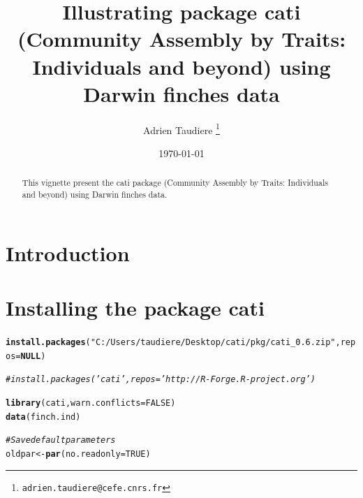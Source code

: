 \documentclass[12pt]{article}\usepackage[]{graphicx}\usepackage[]{color}
\title{Illustrating package cati (Community Assembly by Traits: Individuals and beyond) using Darwin finches data}
\author{Adrien Taudiere
  \thanks{\texttt{adrien.taudiere@cefe.cnrs.fr}}
}
\affil{{\footnotesize EPHE \\CEFE - Centre d'Ecologie Fonctionnelle et Evolutive}}
\date{\today}
\makeatletter
\newcommand{\hlnum}[1]{\textcolor[rgb]{0.686,0.059,0.569}{#1}}%
\newcommand{\hlstr}[1]{\textcolor[rgb]{0.192,0.494,0.8}{#1}}%
\newcommand{\hlcom}[1]{\textcolor[rgb]{0.678,0.584,0.686}{\textit{#1}}}%
\newcommand{\hlstd}[1]{\textcolor[rgb]{0.345,0.345,0.345}{#1}}%
\newcommand{\hlkwa}[1]{\textcolor[rgb]{0.161,0.373,0.58}{\textbf{#1}}}%
\newcommand{\hlkwb}[1]{\textcolor[rgb]{0.69,0.353,0.396}{#1}}%
\newcommand{\hlkwc}[1]{\textcolor[rgb]{0.333,0.667,0.333}{#1}}%
\newcommand{\hlkwd}[1]{\textcolor[rgb]{0.737,0.353,0.396}{\textbf{#1}}}%
\newenvironment{kframe}{%
 \def\at@end@of@kframe{}%
 \ifinner\ifhmode%
  \def\at@end@of@kframe{\end{minipage}}%
  \begin{minipage}{\columnwidth}%
 \fi\fi%
 \def\FrameCommand##1{\hskip\@totalleftmargin \hskip-\fboxsep
 \colorbox{shadecolor}{##1}\hskip-\fboxsep
     \hskip-\linewidth \hskip-\@totalleftmargin \hskip\columnwidth}%
 \MakeFramed {\advance\hsize-\width
   \@totalleftmargin\z@ \linewidth\hsize
   \@setminipage}}%
 {\par\unskip\endMakeFramed%
 \at@end@of@kframe}
\newenvironment{knitrout}{}{} %
\makeatother
\begin{document}





\color{black}



\maketitle

\begin{abstract}
  This vignette present the cati package (Community Assembly by Traits: Individuals and beyond) using Darwin finches data.
\end{abstract}


\newpage
\tableofcontents


\newpage


\section{Introduction}



\section{Installing the package cati}

\begin{knitrout}
\color{fgcolor}\begin{kframe}
\begin{alltt}
\hlkwd{install.packages}\hlstd{(}\hlstr{"C:/Users/taudiere/Desktop/cati/pkg/cati_0.6.zip"}\hlstd{,} \hlkwc{repos} \hlstd{=} \hlkwa{NULL}\hlstd{)}
\end{alltt}


{\ttfamily\noindent\itshape\color{messagecolor}{\#\# Installing package into 'C:/Users/taudiere/Documents/R/win-library/3.0'\\\#\# (as 'lib' is unspecified)}}\begin{alltt}
\hlcom{# install.packages('cati', repos='http://R-Forge.R-project.org')}
\end{alltt}
\end{kframe}
\end{knitrout}


\begin{knitrout}
\color{fgcolor}\begin{kframe}
\begin{alltt}
\hlkwd{library}\hlstd{(cati,} \hlkwc{warn.conflicts} \hlstd{=} \hlnum{FALSE}\hlstd{)}
\hlkwd{data}\hlstd{(finch.ind)}

\hlcom{# Save default parameters}
\hlstd{oldpar} \hlkwb{<-} \hlkwd{par}\hlstd{(}\hlkwc{no.readonly} \hlstd{=} \hlnum{TRUE}\hlstd{)}
\end{alltt}
\end{kframe}
\end{knitrout}
\end{document}
